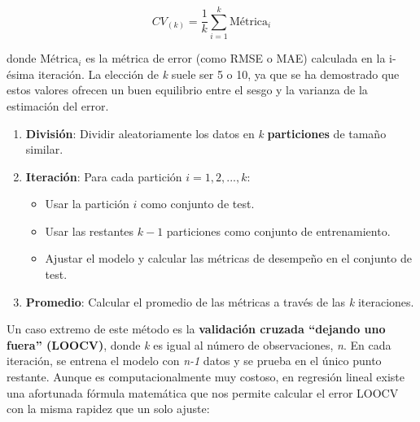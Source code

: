 \documentclass[
  letterpaper,
  DIV=11,
  numbers=noendperiod]{scrreprt}
\providecommand{\tightlist}{%
  \setlength{\itemsep}{0pt}\setlength{\parskip}{0pt}}
\begin{document}
\[CV_{(k)} = \frac{1}{k}\sum_{i=1}^{k} \text{Métrica}_i\]

donde \(\text{Métrica}_i\) es la métrica de error (como RMSE o MAE)
calculada en la i-ésima iteración. La elección de \emph{k} suele ser 5 o
10, ya que se ha demostrado que estos valores ofrecen un buen equilibrio
entre el sesgo y la varianza de la estimación del error.

\begin{tcolorbox}[enhanced jigsaw, leftrule=.75mm, breakable, colbacktitle=quarto-callout-note-color!10!white, bottomrule=.15mm, colframe=quarto-callout-note-color-frame, toprule=.15mm, colback=white, coltitle=black, bottomtitle=1mm, left=2mm, title=\textcolor{quarto-callout-note-color}{\faInfo}\hspace{0.5em}{Procedimiento de k-particiones}, opacityback=0, arc=.35mm, opacitybacktitle=0.6, toptitle=1mm, titlerule=0mm, rightrule=.15mm]

\begin{enumerate}
\def\labelenumi{\arabic{enumi}.}
\tightlist
\item
  \textbf{División}: Dividir aleatoriamente los datos en \emph{k}
  \textbf{particiones} de tamaño similar.
\item
  \textbf{Iteración}: Para cada partición \(i = 1, 2, ..., k\):

  \begin{itemize}
  \tightlist
  \item
    Usar la partición \(i\) como conjunto de test.
  \item
    Usar las restantes \(k-1\) particiones como conjunto de
    entrenamiento.
  \item
    Ajustar el modelo y calcular las métricas de desempeño en el
    conjunto de test.
  \end{itemize}
\item
  \textbf{Promedio}: Calcular el promedio de las métricas a través de
  las \emph{k} iteraciones.
\end{enumerate}

\end{tcolorbox}

Un caso extremo de este método es la \textbf{validación cruzada
``dejando uno fuera'' (LOOCV)}, donde \emph{k} es igual al número de
observaciones, \emph{n}. En cada iteración, se entrena el modelo con
\emph{n-1} datos y se prueba en el único punto restante. Aunque es
computacionalmente muy costoso, en regresión lineal existe una
afortunada fórmula matemática que nos permite calcular el error LOOCV
con la misma rapidez que un solo ajuste:
\end{document}
